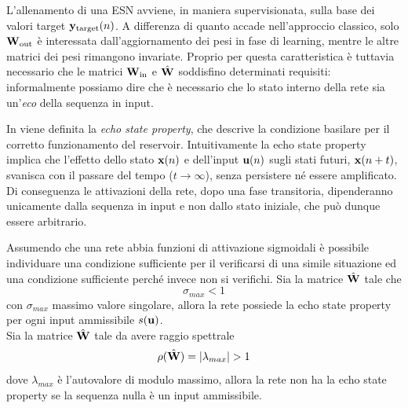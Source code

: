 L'allenamento di una ESN avviene, in maniera supervisionata, sulla base dei valori target $\mathbf{y}_{\textup{target}}(n)$. A differenza di quanto accade nell'approccio classico, solo $\matr{W}_{\textup{out}}$ è interessata dall'aggiornamento dei pesi in fase di learning, mentre le altre matrici dei pesi rimangono invariate. Proprio per questa caratteristica è tuttavia necessario che le matrici $\matr{W}_{\textup{in}}$ e $\hat{\matr{W}}$ soddisfino determinati requisiti: informalmente possiamo dire che è necessario che lo stato interno della rete sia un'\emph{eco} della sequenza in input.

In \cite{Jaeger:EchoStateApproach, Jaeger:ShortTermMemory} viene definita la \emph{echo state property}, che descrive la condizione basilare per il corretto funzionamento del reservoir. Intuitivamente la echo state property implica che l'effetto dello stato $\mathbf{x}(n)$ e dell'input $\mathbf{u}(n)$ sugli stati futuri, $\mathbf{x}(n+t)$, svanisca con il passare del tempo ($t \rightarrow \infty$), senza persistere né essere amplificato. Di conseguenza le attivazioni della rete, dopo una fase transitoria, dipenderanno unicamente dalla sequenza in input e non dallo stato iniziale, che può dunque essere arbitrario. 

Assumendo che una rete abbia funzioni di attivazione sigmoidali è possibile individuare una condizione sufficiente per il verificarsi di una simile situazione ed una condizione sufficiente perché invece non si verifichi. Sia la matrice $\hat{\matr{W}}$ tale che 
\begin{equation}
\sigma_{max} < 1
\end{equation}
con $\sigma_{max}$ massimo valore singolare, allora la rete possiede la echo state property per ogni input ammissibile $s(\mathbf{u})$.\\
Sia la matrice $\hat{\matr{W}}$ tale da avere raggio spettrale 
\begin{equation}
\rho(\hat{\matr{W}}) = \abs{\lambda_{max}} > 1
\end{equation}
dove $\lambda_{max}$ è l'autovalore di modulo massimo, allora la rete non ha la echo state property se la sequenza nulla è un input ammissibile. 

